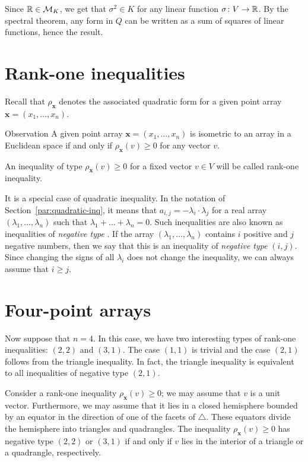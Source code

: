 \documentclass[a4paper,10pt]{article}
\begin{document}
Since $\mathbb{R}\in \mathcal{M}_K$, we get that $\sigma^2\in K$ for any linear function $\sigma\colon V\to\mathbb{R}$.
By the spectral theorem, any form in $Q$ can be written as a sum of squares of linear functions, hence the result.
\qeds

\section{Rank-one inequalities}\label{par:rank-one}
Recall that $\rho_{\bm{x}}$ denotes the associated quadratic form for a given point array $\bm{x}=(x_1,\dots,x_n)$.

\begin{thm}{Observation}\label{obs:rank-one}
A given point array $\bm{x}=(x_1,\dots,x_n)$ is isometric to an array in a Euclidean space if and only if $\rho_{\bm{x}}(v)\ge 0$ for any vector $v$.
\end{thm}

An inequality of type $\rho_{\bm{x}}(v)\ge 0$ for a fixed vector $v\in V$ will be called rank-one inequality.

It is a special case of quadratic inequality.
In the notation of Section~\ref{par:quadratic-inq}, it means that $a_{i,j}=-\lambda_i\cdot\lambda_j$ for a real array $(\lambda_1,\dots, \lambda_n)$ such that
$\lambda_1+\dots+\lambda_n=0$.
Such inequalities are also known as inequalities of \emph{negative type} \cite{deza-lauren}.
If the array $(\lambda_1,\dots, \lambda_n)$ contains $i$ positive and $j$ negative numbers,
then we say that this is an inequality of \emph{negative type} $(i,j)$.
Since changing the signs of all $\lambda_i$ does not change the inequality, we can always assume that $i\ge j$.

\section{Four-point arrays}\label{Four-point arrays}
Now suppose that $n=4$.
In this case, we have two interesting types of rank-one inequalities: $(2,2)$ and $(3,1)$.
The case $(1,1)$ is trivial and 
the case $(2,1)$ follows from the triangle inequality.
In fact, the triangle inequality is equivalent to all inequalities of negative type $(2,1)$.

Consider a rank-one inequality $\rho_{\bm{x}}(v)\ge 0$; we may assume that $v$ is a unit vector.
Furthermore, we may assume that it lies in a closed hemisphere bounded by an equator in the direction of one of the facets of $\triangle$.
These equators divide the hemisphere into triangles and quadrangles.
The inequality $\rho_{\bm{x}}(v)\ge 0$ has negative type $(2,2)$ or $(3,1)$
if and only if $v$ lies in the interior of a triangle or a quadrangle, respectively.
\end{document}
